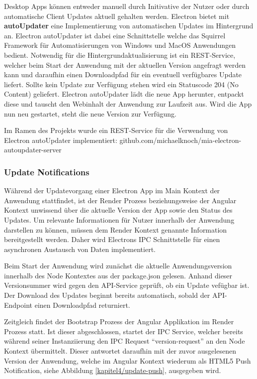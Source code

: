 Desktop Apps können entweder manuell durch Initivative der Nutzer oder durch
automatische Client Updates aktuell gehalten werden.
Electron bietet mit \textbf{autoUpdater} eine Implementierung
von automatischen Updates im Hintergrund an.
Electron autoUpdater ist dabei eine Schnittstelle welche das Squirrel Framework
für Automatisierungen von Windows und MacOS Anwendungen bedient.
Notwendig für die Hintergrundaktualisierung ist ein REST-Service, welcher beim Start der Anwendung mit der
aktuellen Version angefragt werden kann
und daraufhin einen Downloadpfad für ein eventuell verfügbares Update liefert.
Sollte kein Update zur Verfügung stehen wird ein Statuscode 204 (No Content) geliefert.
Electron autoUpdater lädt die neue App herunter, entpackt diese und tauscht den Webinhalt der Anwendung zur Laufzeit aus.
Wird die App nun neu gestartet, steht die neue Version zur Verfügung.

Im Ramen des Projekts \projectname{} wurde ein REST-Service für die
Verwendung von Electron autoUpdater implementiert:
github.com/michaelknoch/mia-electron-autoupdater-server

\subsubsection{Update Notifications}

Während der Updatevorgang einer Electron App im Main Kontext der
Anwendung stattfindet, ist der Render Prozess beziehungsweise der Angular Kontext unwissend über die aktuelle
Version der App sowie den Status des Updates. Um relevante Informationen für Nutzer innerhalb der Anwendung darstellen zu können,
müssen dem Render Kontext genannte Information bereitgestellt werden.
Daher wird Electrons IPC Schnittstelle für einen asynchronen Austausch von Daten implementiert.

Beim Start der Anwendung wird zunächst die aktuelle Anwendungsversion innerhalb des Node Kontextes aus der package.json gelesen.
Anhand dieser Versionsummer wird gegen den API-Service geprüft, ob ein Update vefügbar ist. Der Download des Updates beginnt bereits automatisch,
sobald der API-Endpoint einen Downloadpfad returniert.

Zeitgleich findet der Bootstrap Prozess der Angular Applikation im Render Prozess statt.
Ist dieser abgeschlossen, startet der IPC Service, welcher bereits während seiner Instanziierung den
IPC Request ``version-request'' an den Node Kontext übermittelt.
Dieser antwortet daraufhin mit der zuvor ausgelesenen Version der Anwendung, welche im Angular Kontext wiederum als HTML5 Push Notification, siehe Abbildung \ref{kapitel4/update-push}, ausgegeben wird.

